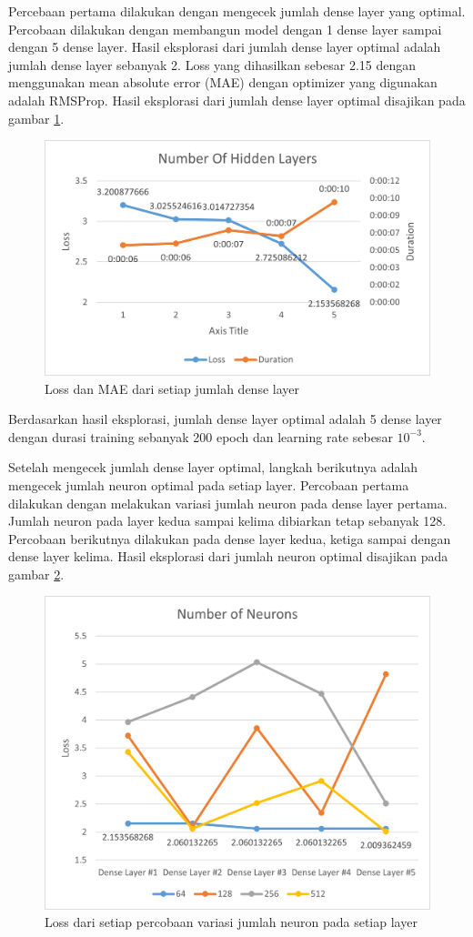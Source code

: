 \documentclass[a4, 12px]{article}
\theoremstyle{definition}
\theoremstyle{remark}
\begin{document}
Percebaan pertama dilakukan dengan mengecek jumlah dense layer yang optimal. Percobaan dilakukan dengan membangun model dengan 1 dense layer sampai dengan 5 dense layer. Hasil eksplorasi dari jumlah dense layer optimal adalah jumlah dense layer sebanyak 2. Loss yang dihasilkan sebesar 2.15 dengan menggunakan mean absolute error (MAE) dengan optimizer yang digunakan adalah RMSProp. Hasil eksplorasi dari jumlah dense layer optimal disajikan pada gambar \ref{fig:R1}.    
\begin{figure}[!h]
	\centering
	\includegraphics[width=0.7\linewidth]{src/R1}
	\caption{Loss dan MAE dari setiap jumlah dense layer}
	\label{fig:R1}
\end{figure}

Berdasarkan hasil eksplorasi, jumlah dense layer optimal adalah 5 dense layer dengan durasi training sebanyak 200 epoch dan learning rate sebesar $10^{-3}$.
    
Setelah mengecek jumlah dense layer optimal, langkah berikutnya adalah mengecek jumlah neuron optimal pada setiap layer. Percobaan pertama dilakukan dengan melakukan variasi jumlah neuron pada dense layer pertama. Jumlah neuron pada layer kedua sampai kelima dibiarkan tetap sebanyak 128. Percobaan berikutnya dilakukan pada dense layer kedua, ketiga sampai dengan dense layer kelima. Hasil eksplorasi dari jumlah neuron optimal disajikan pada gambar \ref{fig:R2}.


\begin{figure}[!h]
	\centering
	\includegraphics[width=0.7\linewidth]{src/R2}
	\caption{Loss dari setiap percobaan variasi jumlah neuron pada setiap layer}
	\label{fig:R2}
\end{figure}
\end{document}

